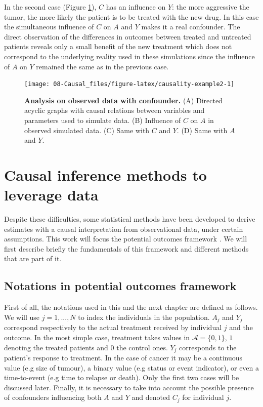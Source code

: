 \documentclass[a4paper,12pt,twoside,onecolumn,openright,final,oldfontcommands]{memoir}
\begin{document}
In the second case (Figure \ref{fig:causality-example2}), \(C\) has an
influence on \(Y\): the more aggressive the tumor, the more likely the
patient is to be treated with the new drug. In this case the
simultaneous influence of \(C\) on \(A\) and \(Y\) makes it a real
confounder. The direct observation of the differences in outcomes
between treated and untreated patients reveals only a small benefit of
the new treatment which does not correspond to the underlying reality
used in these simulations since the influence of \(A\) on \(Y\) remained
the same as in the previous case.

\begin{figure}

{\centering \texttt{[image: 08-Causal\_files/figure-latex/causality-example2-1]} 

}

\caption[Analysis on observed data with confounder]{\textbf{Analysis on observed data with
confounder.} (A) Directed acyclic graphs with causal relations between
variables and parameters used to simulate data. (B) Influence of \(C\)
on \(A\) in observed simulated data. (C) Same with \(C\) and \(Y\). (D)
Same with \(A\) and \(Y\).}\label{fig:causality-example2}
\end{figure}







\section{Causal inference methods to leverage
data}\label{causal-inference-methods-to-leverage-data}

Despite these difficulties, some statistical methods have been developed
to derive estimates with a causal interpretation from observational
data, under certain assumptions. This work will focus the potential
outcomes framework \citep{rubin1974estimating}. We will first describe
briefly the fundamentals of this framework and different methods that
are part of it.

\subsection{Notations in potential outcomes
framework}\label{notations-in-potential-outcomes-framework}

First of all, the notations used in this and the next chapter are
defined as follows. We will use \(j=1,...,N\) to index the individuals
in the population. \(A_j\) and \(Y_j\) correspond respectively to the
actual treatment received by individual \(j\) and the outcome. In the
most simple case, treatment takes values in \(\mathcal{A}=\{0, 1\}\),
\(1\) denoting the treated patients and \(0\) the control ones. \(Y_j\)
corresponds to the patient's response to treatment. In the case of
cancer it may be a continuous value (e.g size of tumour), a binary value
(e.g status or event indicator), or even a time-to-event (e.g time to
relapse or death). Only the first two cases will be discussed later.
Finally, it is necessary to take into account the possible presence of
confounders influencing both \(A\) and \(Y\) and denoted \(C_j\) for
individual \(j\).
\end{document}
